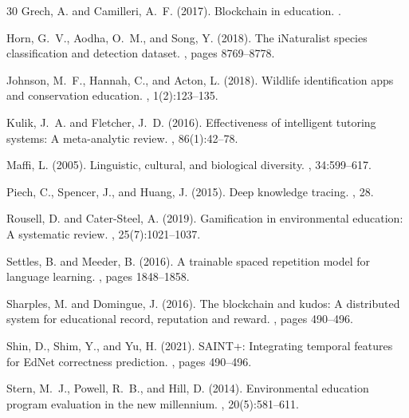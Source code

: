 \begin{thebibliography}{30}
Grech, A. and Camilleri, A.~F. (2017).
\newblock Blockchain in education.
.

Horn, G.~V., Aodha, O.~M., and Song, Y. (2018).
\newblock The iNaturalist species classification and detection dataset.
, pages 8769--8778.

Johnson, M.~F., Hannah, C., and Acton, L. (2018).
\newblock Wildlife identification apps and conservation education.
, 1(2):123--135.

Kulik, J.~A. and Fletcher, J.~D. (2016).
\newblock Effectiveness of intelligent tutoring systems: A meta-analytic review.
, 86(1):42--78.

Maffi, L. (2005).
\newblock Linguistic, cultural, and biological diversity.
, 34:599--617.

Piech, C., Spencer, J., and Huang, J. (2015).
\newblock Deep knowledge tracing.
, 28.

Rousell, D. and Cater-Steel, A. (2019).
\newblock Gamification in environmental education: A systematic review.
, 25(7):1021--1037.

Settles, B. and Meeder, B. (2016).
\newblock A trainable spaced repetition model for language learning.
, pages 1848--1858.

Sharples, M. and Domingue, J. (2016).
\newblock The blockchain and kudos: A distributed system for educational record, reputation and reward.
, pages 490--496.

Shin, D., Shim, Y., and Yu, H. (2021).
\newblock SAINT+: Integrating temporal features for EdNet correctness prediction.
, pages 490--496.

Stern, M.~J., Powell, R.~B., and Hill, D. (2014).
\newblock Environmental education program evaluation in the new millennium.
, 20(5):581--611.


\end{thebibliography}

